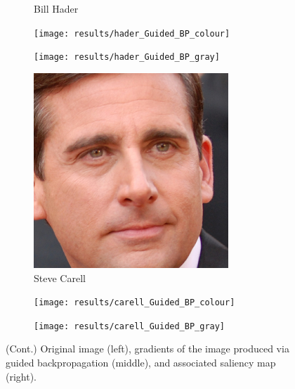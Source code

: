 \documentclass{article}
\begin{document}
\begin{figure}
\begin{subfigure}[t]{0.33\linewidth}
		\caption{Bill Hader}
	\end{subfigure}
	\begin{subfigure}[t]{0.33\linewidth}
		\texttt{[image: results/hader\_Guided\_BP\_colour]}
	\end{subfigure}
	\begin{subfigure}[t]{0.33\linewidth}
		\texttt{[image: results/hader\_Guided\_BP\_gray]}
	\end{subfigure}\vspace{1em}
	\begin{subfigure}[t]{0.33\linewidth}
		\includegraphics[width=\linewidth]{most_carell}
		\caption{Steve Carell}
	\end{subfigure}
	\begin{subfigure}[t]{0.33\linewidth}
		\texttt{[image: results/carell\_Guided\_BP\_colour]}
	\end{subfigure}
	\begin{subfigure}[t]{0.33\linewidth}
		\texttt{[image: results/carell\_Guided\_BP\_gray]}
	\end{subfigure}
	\caption{(Cont.) Original image (left), gradients of the image produced via guided backpropagation (middle), and associated saliency map (right).}
	\label{fig:guided backpropagation}
\end{figure}
\end{document}
